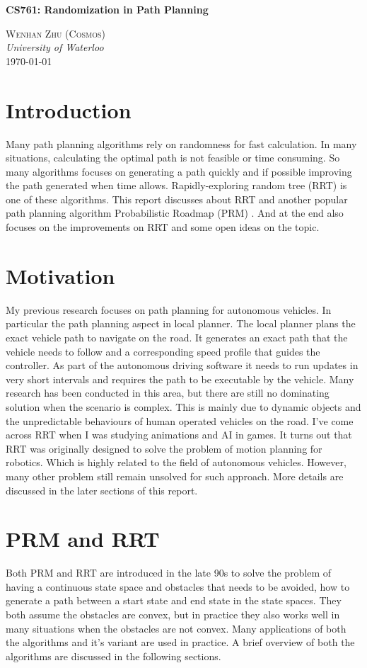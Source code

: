 \documentclass[12pt]{article}
\renewcommand{\maketitle}{
    \begin{flushright}
        {\LARGE \textbf{CS761: Randomization in Path Planning}}


    {\large \textsc{Wenhan Zhu (Cosmos)} \\ \textit{University of Waterloo}}
    \\ \today

    \end{flushright}
}
\begin{document}
\maketitle

\section*{Introduction}
Many path planning algorithms rely on randomness for fast calculation. In many situations, calculating the optimal path is not feasible or time consuming. So many algorithms focuses on generating a path quickly and if possible improving the path generated when time allows. Rapidly-exploring random tree (RRT)\cite{LaValle1998} is one of these algorithms. This report discusses about RRT and another popular path planning algorithm Probabilistic Roadmap (PRM) \cite{Kavraki1996}. And at the end also focuses on the improvements on RRT and some open ideas on the topic.

\section*{Motivation}
My previous research focuses on path planning for autonomous vehicles. In particular the path planning aspect in local planner. The local planner plans the exact vehicle path to navigate on the road. It generates an exact path that the vehicle needs to follow and a corresponding speed profile that guides the controller. As part of the autonomous driving software it needs to run updates in very short intervals and requires the path to be executable by the vehicle. Many research has been conducted in this area, but there are still no dominating solution when the scenario is complex. This is mainly due to dynamic objects and the unpredictable behaviours of human operated vehicles on the road. I've come across RRT when I was studying animations and AI in games. It turns out that RRT was originally designed to solve the problem of motion planning for robotics. Which is highly related to the field of autonomous vehicles. However, many other problem still remain unsolved for such approach. More details are discussed in the later sections of this report.

\section*{PRM and RRT}
Both PRM and RRT are introduced in the late 90s to solve the problem of having a continuous state space and obstacles that needs to be avoided, how to generate a path between a start state and end state in the state spaces. They both assume the obstacles are convex, but in practice they also works well in many situations when the obstacles are not convex. Many applications of both the algorithms and it's variant are used in practice. A brief overview of both the algorithms are discussed in the following sections. 
\end{document}
